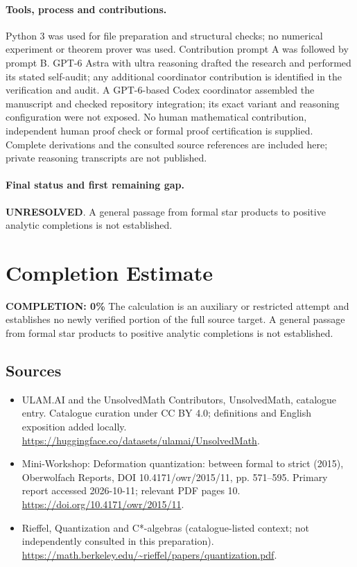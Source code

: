 \documentclass[11pt]{article}
\begin{document}
\paragraph{Tools, process and contributions.}
Python 3 was used for file preparation and structural checks; no numerical experiment or theorem prover was used. Contribution prompt A was followed by prompt B. GPT-6 Astra with ultra reasoning drafted the research and performed its stated self-audit; any additional coordinator contribution is identified in the verification and audit. A GPT-6-based Codex coordinator assembled the manuscript and checked repository integration; its exact variant and reasoning configuration were not exposed. No human mathematical contribution, independent human proof check or formal proof certification is supplied. Complete derivations and the consulted source references are included here; private reasoning transcripts are not published.

\paragraph{Final status and first remaining gap.}
\textbf{UNRESOLVED}. A general passage from formal star products to positive analytic completions is not established.

\section{Completion Estimate}
\noindent\textbf{COMPLETION: 0\%}
The calculation is an auxiliary or restricted attempt and establishes no newly verified portion of the full source target. A general passage from formal star products to positive analytic completions is not established.

\subsection{Sources}
\begin{itemize}
\item[\hypertarget{source:statement:1}{S1}] ULAM.AI and the UnsolvedMath Contributors, UnsolvedMath, catalogue entry. Catalogue curation under CC BY 4.0; definitions and English exposition added locally.
\url{https://huggingface.co/datasets/ulamai/UnsolvedMath}.
\item[\hypertarget{source:statement:2}{S2}] Mini-Workshop: Deformation quantization: between formal to strict (2015), Oberwolfach Reports, DOI 10.4171/owr/2015/11, pp. 571--595. Primary report accessed 2026-10-11; relevant PDF pages 10.
\url{https://doi.org/10.4171/owr/2015/11}.
\item[\hypertarget{source:statement:3}{S3}] Rieffel, Quantization and C*-algebras (catalogue-listed context; not independently consulted in this preparation).
\url{https://math.berkeley.edu/~rieffel/papers/quantization.pdf}.
\end{itemize}
\label{end:statement}
\end{document}
